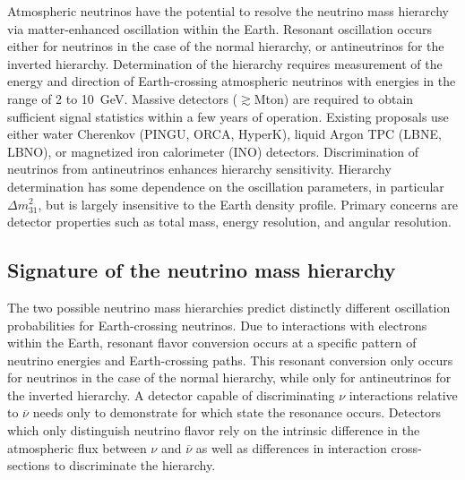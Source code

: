 
Atmospheric neutrinos have the potential to resolve the neutrino mass
hierarchy via matter-enhanced oscillation within the Earth.  Resonant
oscillation occurs either for neutrinos in the case of the normal
hierarchy, or antineutrinos for the inverted hierarchy.  Determination
of the hierarchy requires measurement of the energy and direction of
Earth-crossing atmospheric neutrinos with energies in the range of 2
to 10~GeV. Massive detectors ($\gtrsim$Mton) are required to obtain
sufficient signal statistics within a few years of operation.
Existing proposals use either water Cherenkov (PINGU, ORCA, HyperK),
liquid Argon TPC (LBNE, LBNO), or magnetized iron calorimeter (INO)
detectors.  Discrimination of neutrinos from antineutrinos enhances
hierarchy sensitivity.  Hierarchy determination has some dependence on
the oscillation parameters, in particular ${\Delta}m^2_{31}$, but is largely
insensitive to the 
Earth density
profile.  Primary concerns are detector properties such as total mass,
energy resolution, and angular resolution.

\subsection{Signature of the neutrino mass hierarchy}\label{atm:sign}

The two possible neutrino mass hierarchies predict distinctly
different oscillation probabilities for Earth-crossing neutrinos.  Due
to interactions with electrons within the Earth, resonant flavor
conversion occurs at a specific pattern of neutrino energies and
Earth-crossing paths.  This resonant conversion only occurs for
neutrinos in the case of the normal hierarchy, while only for
antineutrinos for the inverted hierarchy.  A detector capable of
discriminating $\nu$ interactions relative to $\overline{\nu}$ needs
only to demonstrate for which state the resonance occurs.  Detectors which
only distinguish neutrino flavor rely on the intrinsic difference in
the atmospheric flux between $\nu$ and $\overline{\nu}$ as well as
differences in interaction cross-sections to discriminate the
hierarchy.


